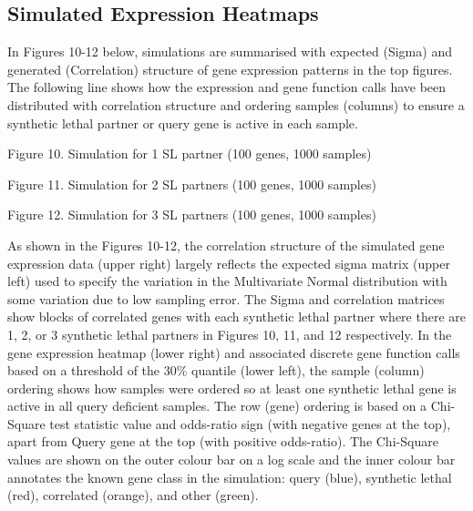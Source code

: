 \subsection{Simulated Expression Heatmaps}

In Figures 10-12 below, simulations are summarised with expected (Sigma) and generated (Correlation) structure of gene expression patterns in the top figures.  The following line shows how the expression and gene function calls have been distributed with correlation structure and ordering samples (columns) to ensure a synthetic lethal partner or query gene is active in each sample.

Figure 10.  Simulation for 1 SL partner (100 genes, 1000 samples)

Figure 11.  Simulation for 2 SL partners (100 genes, 1000 samples)

Figure 12.  Simulation for 3 SL partners (100 genes, 1000 samples)

As shown in the Figures 10-12, the correlation structure of the simulated gene expression data (upper right) largely reflects the expected sigma matrix (upper left) used to specify the variation in the Multivariate Normal distribution with some variation due to low sampling error.  The Sigma and correlation matrices show blocks of correlated genes with each synthetic lethal partner where there are 1, 2, or 3 synthetic lethal partners in Figures 10, 11, and 12 respectively.  In the gene expression heatmap (lower right) and associated discrete gene function calls based on a threshold of the 30\% quantile (lower left), the sample (column) ordering shows how samples were ordered so at least one synthetic lethal gene is active in all query deficient samples.  The row (gene) ordering is based on a Chi-Square test statistic value and odds-ratio sign (with negative genes at the top), apart from Query gene at the top (with positive odds-ratio).  The Chi-Square values are shown on the outer colour bar on a log scale and the inner colour bar annotates the known gene class in the simulation: query (blue), synthetic lethal (red), correlated (orange), and other (green).

